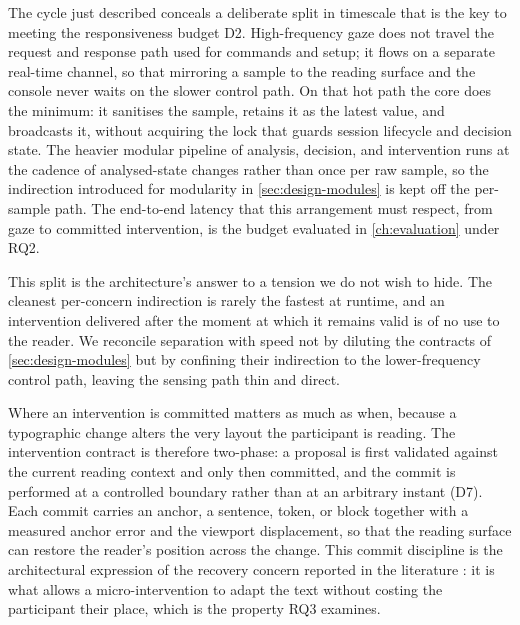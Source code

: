 The cycle just described conceals a deliberate split in timescale that is the key to meeting the responsiveness budget D2.
High-frequency gaze does not travel the request and response path used for commands and setup; it flows on a separate real-time channel, so that mirroring a sample to the reading surface and the console never waits on the slower control path.
On that hot path the core does the minimum: it sanitises the sample, retains it as the latest value, and broadcasts it, without acquiring the lock that guards session lifecycle and decision state.
The heavier modular pipeline of analysis, decision, and intervention runs at the cadence of analysed-state changes rather than once per raw sample, so the indirection introduced for modularity in \cref{sec:design-modules} is kept off the per-sample path.
The end-to-end latency that this arrangement must respect, from gaze to committed intervention, is the budget evaluated in \cref{ch:evaluation} under RQ2.

This split is the architecture's answer to a tension we do not wish to hide.
The cleanest per-concern indirection is rarely the fastest at runtime, and an intervention delivered after the moment at which it remains valid is of no use to the reader.
We reconcile separation with speed not by diluting the contracts of \cref{sec:design-modules} but by confining their indirection to the lower-frequency control path, leaving the sensing path thin and direct.

Where an intervention is committed matters as much as when, because a typographic change alters the very layout the participant is reading.
The intervention contract is therefore two-phase: a proposal is first validated against the current reading context and only then committed, and the commit is performed at a controlled boundary rather than at an arbitrary instant (D7).
Each commit carries an anchor, a sentence, token, or block together with a measured anchor error and the viewport displacement, so that the reading surface can restore the reader's position across the change.
This commit discipline is the architectural expression of the recovery concern reported in the literature \cite{jensen2025context}: it is what allows a micro-intervention to adapt the text without costing the participant their place, which is the property RQ3 examines.

